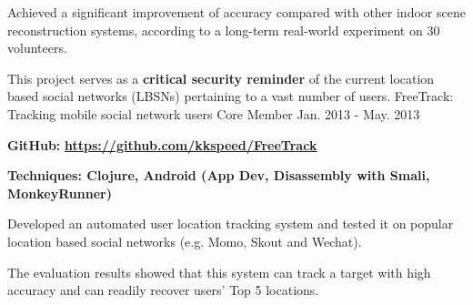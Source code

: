 \begin{cventries}
{\begin{cvitems}
\item Achieved a significant improvement of accuracy compared with other indoor scene reconstruction systems, according to a long-term real-world experiment on 30 volunteers. 
      \end{cvitems}
    }
  \cventry
    {This project serves as a \textbf{critical security reminder} of the current location based social networks (LBSNs) pertaining to a vast number of users. }
    {FreeTrack: Tracking mobile social network users}
    {Core Member}
    {Jan. 2013 - May. 2013}
    {
      \begin{cvitems}
                  \item \textbf{GitHub:} \href{https://github.com/kkspeed/FreeTrack}{\textbf{\underline{https://github.com/kkspeed/FreeTrack}}}
      \item \textbf{Techniques: Clojure, Android (App Dev, Disassembly with Smali, MonkeyRunner)} 
\item Developed an automated user location tracking system and tested it on popular location based social networks (e.g. Momo, Skout and Wechat). 
\item The evaluation results showed that this system can track a target with high
accuracy and can readily recover users' Top 5 locations. 
      \end{cvitems} 
    }



\end{cventries}
